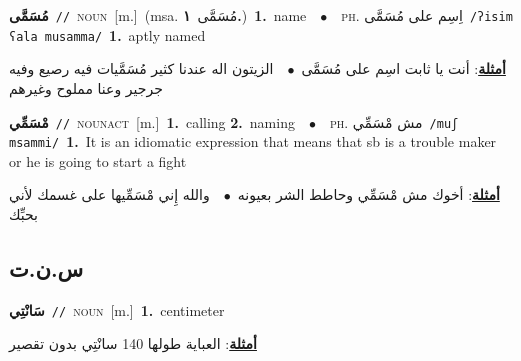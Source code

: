 \documentclass[10pt,a4paper,twoside]{article} %
\begin{document}
\begin{multicols}{2}
{\setlength\topsep{0pt}\textbf{\foreignlanguage{arabic}{مُسَمَّى}}\ {\color{gray}\texttt{//}\color{black}}\ \textsc{noun}\ [m.]\ \color{gray}(msa. \foreignlanguage{arabic}{مُسَمَّى}~\foreignlanguage{arabic}{\textbf{١.}})\color{black}\ \textbf{1.}~name\ \ $\bullet$\ \ \textsc{ph.} \color{gray} \foreignlanguage{arabic}{اِسِم على مُسَمَّى}\color{black}\ {\color{gray}\texttt{/{\sffamily ʔisim ʕala musamma}/}\color{black}}\ \textbf{1.}~aptly named\  \begin{flushright}\color{gray}\foreignlanguage{arabic}{\textbf{\underline{\foreignlanguage{arabic}{أمثلة}}}: أنت يا ثابت اسِم على مُسَمَّى\ $\bullet$\ \  الزيتون اله عندنا كثير مُسَمَّيات فيه رصيع وفيه جرجير وعنا مملوح وغيرهم}\end{flushright}\color{black}} \vspace{2mm}

{\setlength\topsep{0pt}\textbf{\foreignlanguage{arabic}{مْسَمِّي}}\ {\color{gray}\texttt{//}\color{black}}\ \textsc{noun\textunderscore act}\ [m.]\ \textbf{1.}~calling  \textbf{2.}~naming\ \ $\bullet$\ \ \textsc{ph.} \color{gray} \foreignlanguage{arabic}{مش مْسَمِّي}\color{black}\ {\color{gray}\texttt{/{\sffamily muʃ msammi}/}\color{black}}\ \textbf{1.}~It is an idiomatic expression that means that sb is a trouble maker or he is going to start a fight\  \begin{flushright}\color{gray}\foreignlanguage{arabic}{\textbf{\underline{\foreignlanguage{arabic}{أمثلة}}}: أخوك مش مْسَمِّي وحاطط الشر بعيونه\ $\bullet$\ \  والله إِني مْسَمِّيها على غسمك لأني بحبِّك}\end{flushright}\color{black}} \vspace{2mm}

\vspace{-3mm}
\subsection*{\color{blue}\foreignlanguage{arabic}{س.ن.ت}\color{blue}{}} 

{\setlength\topsep{0pt}\textbf{\foreignlanguage{arabic}{سَانْتِي}}\ {\color{gray}\texttt{//}\color{black}}\ \textsc{noun}\ [m.]\ \textbf{1.}~centimeter\  \begin{flushright}\color{gray}\foreignlanguage{arabic}{\textbf{\underline{\foreignlanguage{arabic}{أمثلة}}}: العباية طولها 140 سانْتِي بدون تقصير}\end{flushright}\color{black}} \vspace{2mm}


\end{multicols}
\end{document}
